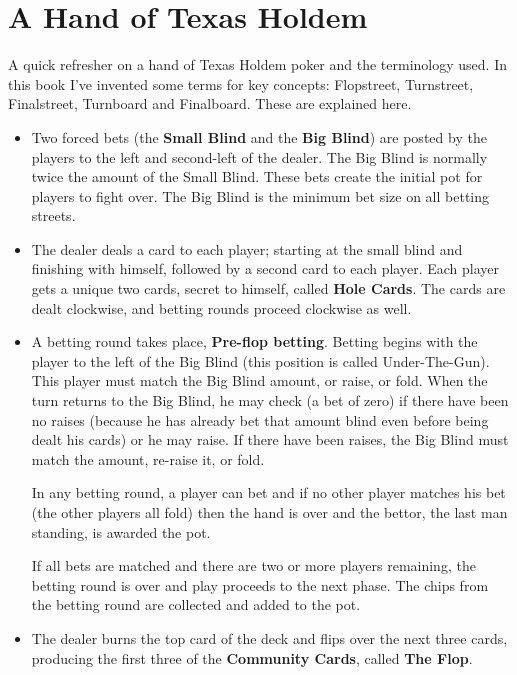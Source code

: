 \chapter{A Hand of Texas Holdem}


A quick refresher on a hand of Texas Holdem poker and the terminology
used. In this book I've invented some terms for key concepts:
Flopstreet, Turnstreet, Finalstreet, Turnboard and Finalboard. These
are explained here.

\begin{itemize}

\item Two forced bets (the \textbf{Small Blind} and the \textbf{Big
  Blind}) are posted by the players to the left and second-left of
  the dealer. The Big Blind is normally twice the amount of the
  Small Blind. These bets create the initial pot for players to
  fight over. The Big Blind is the minimum bet size on all betting streets.
  
\item The dealer deals a card to each player; starting at the small
  blind and finishing with himself, followed by a second card to each
  player. Each player gets a unique two cards, secret to himself,
  called \textbf{Hole Cards}. The cards are dealt clockwise, and
  betting rounds proceed clockwise as well.
  
\item A betting round takes place, \textbf{Pre-flop betting}. Betting
  begins with the player to the left of the Big Blind (this position
  is called Under-The-Gun). This player must match the Big Blind
  amount, or raise, or fold. When the
  turn returns to the Big Blind, he may check (a bet of zero) if there
  have been no raises (because he has already bet that amount blind
  even before being dealt his cards) or he may raise. If there have
  been raises, the Big Blind must match the amount, re-raise it, or
  fold.

  In any betting round, a player can bet and if no other player
  matches his bet (the other players all fold) then the hand is over
  and the bettor, the last man standing, is awarded the pot.

  If all bets are matched and there are two or more players remaining,
  the betting round is over and play proceeds to the next phase.
  The chips from the betting round are collected and added to the pot.

\item The dealer burns the top card of the deck and flips over the
  next three cards, producing the first three of the \textbf{Community
  Cards}, called \textbf{The Flop}.


\end{itemize}
